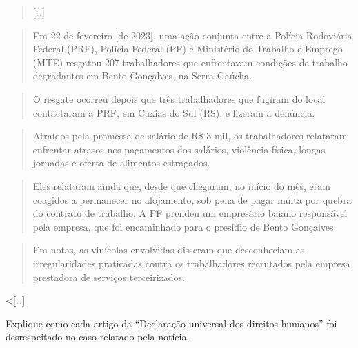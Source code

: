 \begin{quote}
{[}\ldots{}{]}
\end{quote}

\begin{quote}
Em 22 de fevereiro {[}de 2023{]}, uma ação conjunta entre a Polícia
Rodoviária Federal (PRF), Polícia Federal (PF) e Ministério do Trabalho
e Emprego (MTE) resgatou 207 trabalhadores que enfrentavam condições de
trabalho degradantes em Bento Gonçalves, na Serra Gaúcha.
\end{quote}

\begin{quote}
O resgate ocorreu depois que três trabalhadores que fugiram do local
contactaram a PRF, em Caxias do Sul (RS), e fizeram a denúncia.
\end{quote}

\begin{quote}
Atraídos pela promessa de salário de R\$ 3 mil, os trabalhadores
relataram enfrentar atrasos nos pagamentos dos salários, violência
física, longas jornadas e oferta de alimentos estragados.
\end{quote}

\begin{quote}
Eles relataram ainda que, desde que chegaram, no início do mês, eram
coagidos a permanecer no alojamento, sob pena de pagar multa por quebra
do contrato de trabalho. A PF prendeu um empresário baiano responsável
pela empresa, que foi encaminhado para o presídio de Bento Gonçalves.
\end{quote}

\begin{quote}
Em notas, as vinícolas envolvidas disseram que desconheciam as
irregularidades praticadas contra os trabalhadores recrutados pela
empresa prestadora de serviços terceirizados.
\end{quote}

\textless{}{[}\ldots{}{]}


Explique como cada artigo da ``Declaração universal dos direitos
humanos'' foi desrespeitado no caso relatado pela notícia.


